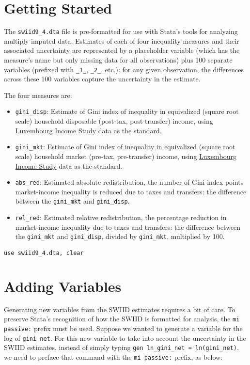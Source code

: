 \documentclass[11pt]{article}
\begin{document}
\section{Getting Started}
The \verb+swiid9_4.dta+ file is pre-formatted for use with Stata's tools for analyzing multiply imputed data.  Estimates of each of four inequality measures and their associated uncertainty are represented by a placeholder variable (which has the measure's name but only missing data for all observations) plus 100 separate variables (prefixed with \verb+_1_+, \verb+_2_+, etc.): for any given observation, the differences across these 100 variables capture the uncertainty in the estimate.   

The four measures are:
\begin{itemize}
	\item \verb+gini_disp+: Estimate of Gini index of inequality in equivalized (square root scale) household disposable (post-tax, post-transfer) income, using \href{http://www.lisdatacenter.org}{Luxembourg Income Study} data as the standard.
	\item \verb+gini_mkt+: Estimate of Gini index of inequality in equivalized (square root scale) household market (pre-tax, pre-transfer) income, using \href{http://www.lisdatacenter.org}{Luxembourg Income Study} data as the standard.	
	\item \verb+abs_red+: Estimated absolute redistribution, the number of Gini-index points market-income inequality is reduced due to taxes and transfers: the difference between the \verb+gini_mkt+ and \verb+gini_disp+.
	\item \verb+rel_red+: Estimated relative redistribution, the percentage reduction in market-income inequality due to taxes and transfers: the difference between the \verb+gini_mkt+ and \verb+gini_disp+, divided by \verb+gini_mkt+, multiplied by 100.
\end{itemize}

\begin{verbatim}
use swiid9_4.dta, clear
\end{verbatim}

\section{Adding Variables}
Generating new variables from the SWIID estimates requires a bit of care.  To preserve Stata's recognition of how the SWIID is formatted for analysis, the \verb+mi passive:+ prefix must be used.  Suppose we wanted to generate a variable for the log of \verb+gini_net+.  For this new variable to take into account the uncertainty in the SWIID estimates, instead of simply typing \verb+gen ln_gini_net = ln(gini_net)+, we need to preface that command with the \verb+mi passive:+ prefix, as below:
\end{document}
